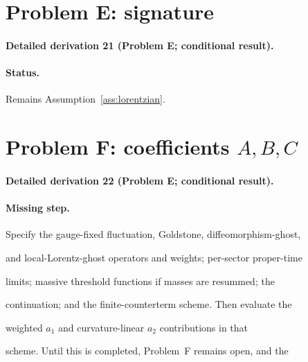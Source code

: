 \section{Problem E: signature}

\label{sec:status-E}



\paragraph{Detailed derivation 21 (Problem E; conditional result).} \label{ref:detail-20} %



\paragraph{Status.}

Remains Assumption~\ref{ass:lorentzian}.



\section{Problem F: coefficients \(A,B,C\)}

\label{sec:status-F}



\paragraph{Detailed derivation 22 (Problem E; conditional result).} \label{ref:detail-21} %



\paragraph{Missing step.}

Specify the gauge-fixed fluctuation, Goldstone, diffeomorphism-ghost,

and local-Lorentz-ghost operators and weights; per-sector proper-time

limits; massive threshold functions if masses are resummed; the

continuation; and the finite-counterterm scheme. Then evaluate the

weighted \(a_1\) and curvature-linear \(a_2\) contributions in that

scheme. Until this is completed, Problem~F remains open, and the

